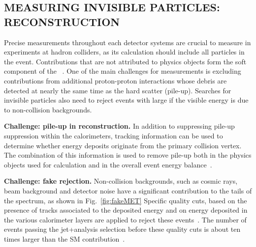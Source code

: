 \begin{textbox}[!h]
\section{MEASURING INVISIBLE PARTICLES: \MET RECONSTRUCTION}

Precise measurements throughout each detector systems are crucial to measure \MET in experiments at hadron colliders, 
as its calculation should include all particles in the event.
Contributions that are not attributed to physics objects form the soft component of the \MET~\cite{Aad:2016nrq,CMS-PAS-JME-16-004}. 
One of the main challenges for \MET measurements is excluding contributions from additional proton-proton interactions whose debris are detected at nearly the same time as the hard scatter (pile-up).
Searches for invisible particles also need to reject events with large \MET if the visible energy is due to non-collision backgrounds. 

\textbf{Challenge: pile-up in \MET reconstruction.} 
In addition to suppressing pile-up suppression within the calorimeters, tracking information can be used to determine whether energy deposits originate from the primary collision vertex. 
The combination of this information is used to remove pile-up both in the physics objects used for \MET calculation and in the overall event energy balance~\cite{CMS-PAS-JME-16-004,ATLAS-CONF-2014-019}. 

\textbf{Challenge: fake \MET rejection.} 
Non-collision backgrounds, such as cosmic rays, beam background and detector noise have a significant contribution to the tails of the \MET spectrum, as shown in Fig.~\ref{fig:fakeMET}
Specific quality cuts, based on the presence of tracks associated to the deposited energy and on energy deposited in the various calorimeter layers are applied to reject these events~\cite{ATLAS-CONF-2015-029}. The number of events passing the jet+\MET analysis selection before these quality cuts is about ten times larger than the SM contribution~\cite{Aaboud:2016tnv}. 
\end{textbox}